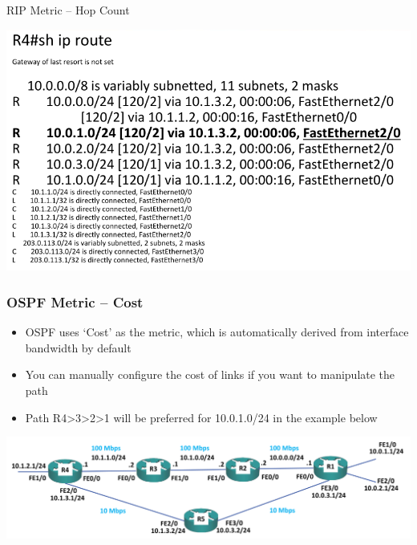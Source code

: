 \documentclass[pdflatex,compress,mathserif]{beamer}
\begin{document}
\begin{frame}{RIP Metric – Hop Count}
	\begin{center}
		\includegraphics[width=\linewidth]{img/img18}
	\end{center}
\end{frame}

\begin{frame}
	\frametitle{OSPF Metric – Cost}
	\begin{itemize}
		\item OSPF uses ‘Cost’ as the metric, which is automatically derived from
interface bandwidth by default
		\item You can manually configure the cost of links if you want to manipulate
the path
		\item Path R4>3>2>1 will be preferred for 10.0.1.0/24 in the example below
	\end{itemize}
	\begin{center}
		\includegraphics[width=\linewidth]{img/img19}
	\end{center}
\end{frame}
\end{document}
